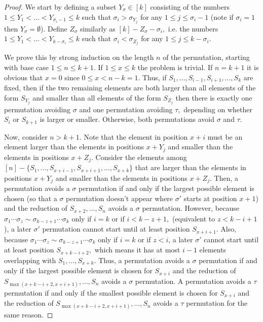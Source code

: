 \documentclass[11pt]{amsart}
\theoremstyle{definition}
\begin{document}
\begin{proof}
    
    We start by defining a subset $Y_{\sigma} \in [k]$ consisting of the numbers $1 \le Y_1 < \dots < Y_{\sigma_i-1} \le k$ such that $\sigma_i > \sigma_{Y_j}$ for any $1 \le j \le \sigma_i-1$ (note if $\sigma_i = 1$ then $Y_{\sigma} = \emptyset$).  Define $Z_{\sigma}$ similarly as $[k] - Z_{\sigma} - \sigma_i,$ i.e. the numbers $1 \le Y_1 < \dots < Y_{k-\sigma_i} \le k$ such that $\sigma_i < \sigma_{Z_j}$ for any  $1 \le j \le k-\sigma_i.$
    
    We prove this by strong induction on the length $n$ of the permutation, starting with base case $1 \le n \le k+1.$  If $1 \le x \le k$ the problem is trivial.  If $n = k+1$ it is obvious that $x = 0$ since $0 \le x < n-k = 1.$ Thus, if $S_1, \dots, S_{i-1}, S_{i+1}, \dots, S_k$ are fixed, then if the two remaining elements are both larger than all elements of the form $S_{Y_j}$ and smaller than all elements of the form $S_{Z_j}$ then there is exactly one permutation avoiding $\sigma$ and one permutation avoiding $\tau,$ depending on whether $S_{i}$ or $S_{k+1}$ is larger or smaller.  Otherwise, both permutations avoid $\sigma$ and $\tau.$
	
    
    Now, consider $n > k+1.$  Note that the element in position $x+i$ must be an element larger than the elements in positions $x+Y_j$ and smaller than the elements in positions $x+Z_j.$  Consider the elements among $[n] - \{S_1, \dots, S_{x+i-1}, S_{x+i+1}, \dots, S_{x+k}\}$ that are larger than the elements in positions $x+Y_j$ and smaller than the elements in positions $x+Z_j.$  Then, a permutation avoids a $\sigma$ permutation if and only if the largest possible element is chosen (so that a $\sigma$ permutation doesn't appear where $\sigma'$ starts at position $x+1$) and the reduction of $S_{x+2}, \dots, S_n$ avoids a $\sigma$ permutation.  However, because $\sigma_1\cdots\sigma_z \sim \sigma_{k-z+1}\cdots\sigma_k$ only if $i = k$ or if $i < k-z+1,$ (equivalent to $z < k-i+1$), a later $\sigma'$ permutation cannot start until at least position $S_{x+i+1}$.  Also, because $\sigma_1\cdots\sigma_z \sim \sigma_{k-z+1}\cdots\sigma_k$ only if $i = k$ or if $z < i$, a later $\sigma'$ cannot start until at least position $S_{x+k-i+2},$ which means it has at most $i-1$ elements overlapping with $S_1, \dots, S_{x+k}.$  Thus, a permutation avoids a $\sigma$ permutation if and only if the largest possible element is chosen for $S_{x+i}$ and the reduction of $S_{\max(x+k-i+2, x+i+1)}, \dots, S_n$ avoids a $\sigma$ permutation.  A permutation avoids a $\tau$ permutation if and only if the smallest possible element is chosen for $S_{x+i}$ and the reduction of $S_{\max(x+k-i+2, x+i+1)}, \dots, S_n$ avoids a $\tau$ permutation for the same reason.
    

\end{proof}
\end{document}

